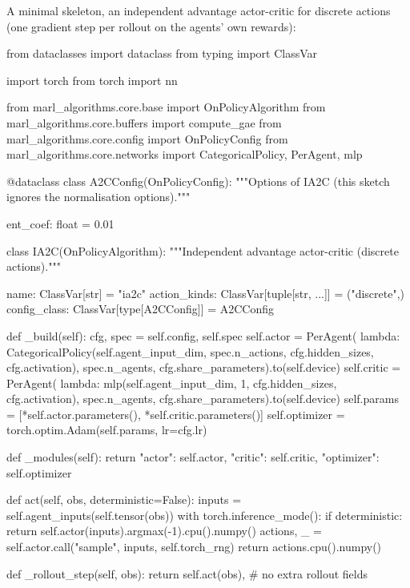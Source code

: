 A minimal skeleton, an independent advantage actor-critic for discrete
actions (one gradient step per rollout on the agents' own rewards):

\begin{pycode}
from dataclasses import dataclass
from typing import ClassVar

import torch
from torch import nn

from marl_algorithms.core.base import OnPolicyAlgorithm
from marl_algorithms.core.buffers import compute_gae
from marl_algorithms.core.config import OnPolicyConfig
from marl_algorithms.core.networks import CategoricalPolicy, PerAgent, mlp


@dataclass
class A2CConfig(OnPolicyConfig):
    """Options of IA2C (this sketch ignores the normalisation options)."""

    ent_coef: float = 0.01


class IA2C(OnPolicyAlgorithm):
    """Independent advantage actor-critic (discrete actions)."""

    name: ClassVar[str] = "ia2c"
    action_kinds: ClassVar[tuple[str, ...]] = ("discrete",)
    config_class: ClassVar[type[A2CConfig]] = A2CConfig

    def _build(self):
        cfg, spec = self.config, self.spec
        self.actor = PerAgent(
            lambda: CategoricalPolicy(self.agent_input_dim, spec.n_actions,
                                      cfg.hidden_sizes, cfg.activation),
            spec.n_agents, cfg.share_parameters).to(self.device)
        self.critic = PerAgent(
            lambda: mlp(self.agent_input_dim, 1, cfg.hidden_sizes,
                        cfg.activation),
            spec.n_agents, cfg.share_parameters).to(self.device)
        self.params = [*self.actor.parameters(), *self.critic.parameters()]
        self.optimizer = torch.optim.Adam(self.params, lr=cfg.lr)

    def _modules(self):
        return {"actor": self.actor, "critic": self.critic,
                "optimizer": self.optimizer}

    def act(self, obs, deterministic=False):
        inputs = self.agent_inputs(self.tensor(obs))
        with torch.inference_mode():
            if deterministic:
                return self.actor(inputs).argmax(-1).cpu().numpy()
            actions, _ = self.actor.call("sample", inputs, self.torch_rng)
        return actions.cpu().numpy()

    def _rollout_step(self, obs):
        return self.act(obs), {}                 # no extra rollout fields


\end{pycode}

